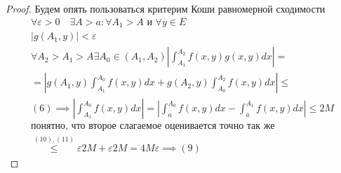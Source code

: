 \documentclass[main]{subfiles}
\begin{document}
     \begin{proof}
          Будем опять пользоваться критерим Коши равномерной сходимости
          \begin{gather*}
               \forall \varepsilon > 0 \quad \exists A > a : \forall A_1 > A \text{ и } \forall y \in E \\
               |g(A_1,y)| < \varepsilon \tag{10}\\
               \forall A_2 > A_1 > A \exists A_0 \in (A_1,A_2) \left | \int^{A_2}_{A_1} f(x,y)g(x,y)dx \right | = \\
              = \left | g(A_1,y) \int^{A_0}_{A_1} f(x,y)dx + g(A_2,y) \int^{A_2}_{A_0}f(x,y)dx \right | \leq\\
               (6) \implies \left | \int^{A_0}_{A_1}  f(x,y) dx \right | = \left | \int^{A_0}_a f(x,y) dx - \int^{A_1}_a f(x,y)dx \right | \leq 2M \tag{11}\\
               \text{понятно, что второе слагаемое оценивается точно так же} \\
               \stackrel{(10),(11)}{\leq} \varepsilon 2M + \varepsilon 2M = 4 M \varepsilon \implies(9)
          \end{gather*}
     \end{proof}
\end{document}
